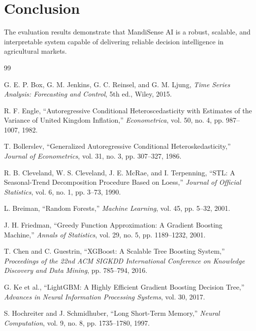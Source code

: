 \documentclass[12pt,a4paper]{report}
\begin{document}
\section{Conclusion}

The evaluation results demonstrate that MandiSense AI is a robust, scalable, and interpretable system capable of delivering reliable decision intelligence in agricultural markets.

\begin{thebibliography}{99}

G. E. P. Box, G. M. Jenkins, G. C. Reinsel, and G. M. Ljung,
\textit{Time Series Analysis: Forecasting and Control}, 5th ed.,
Wiley, 2015.

R. F. Engle,
``Autoregressive Conditional Heteroscedasticity with Estimates of the Variance of United Kingdom Inflation,''
\textit{Econometrica}, vol. 50, no. 4, pp. 987--1007, 1982.

T. Bollerslev,
``Generalized Autoregressive Conditional Heteroskedasticity,''
\textit{Journal of Econometrics}, vol. 31, no. 3, pp. 307--327, 1986.

R. B. Cleveland, W. S. Cleveland, J. E. McRae, and I. Terpenning,
``STL: A Seasonal-Trend Decomposition Procedure Based on Loess,''
\textit{Journal of Official Statistics}, vol. 6, no. 1, pp. 3--73, 1990.

L. Breiman,
``Random Forests,''
\textit{Machine Learning}, vol. 45, pp. 5--32, 2001.

J. H. Friedman,
``Greedy Function Approximation: A Gradient Boosting Machine,''
\textit{Annals of Statistics}, vol. 29, no. 5, pp. 1189--1232, 2001.

T. Chen and C. Guestrin,
``XGBoost: A Scalable Tree Boosting System,''
\textit{Proceedings of the 22nd ACM SIGKDD International Conference on Knowledge Discovery and Data Mining}, pp. 785--794, 2016.

G. Ke et al.,
``LightGBM: A Highly Efficient Gradient Boosting Decision Tree,''
\textit{Advances in Neural Information Processing Systems}, vol. 30, 2017.

S. Hochreiter and J. Schmidhuber,
``Long Short-Term Memory,''
\textit{Neural Computation}, vol. 9, no. 8, pp. 1735--1780, 1997.


\end{thebibliography}
\end{document}
